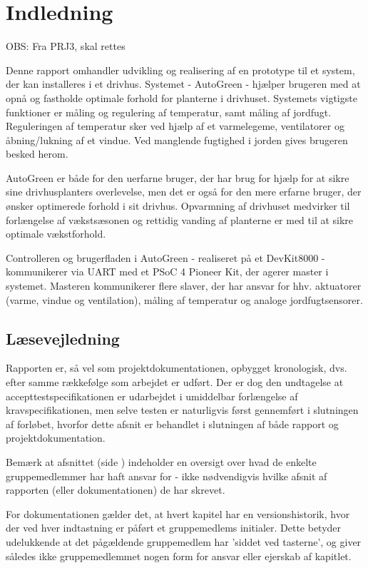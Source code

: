 \chapter{Indledning}
\label{ch:Indledning}

OBS: Fra PRJ3, skal rettes

Denne rapport omhandler udvikling og realisering af en prototype til et system, der kan installeres i et drivhus. 
Systemet - AutoGreen - hjælper brugeren med at opnå og fastholde optimale forhold for planterne i drivhuset.
Systemets vigtigste funktioner er måling og regulering af temperatur, samt måling af jordfugt.
Reguleringen af temperatur sker ved hjælp af et varmelegeme, ventilatorer og åbning/lukning af et vindue. 
Ved manglende fugtighed i jorden gives brugeren besked herom. 

AutoGreen er både for den uerfarne bruger, der har brug for hjælp for at sikre sine drivhusplanters overlevelse, men det er også for den mere erfarne bruger, der ønsker optimerede forhold i sit drivhus. 
Opvarmning af drivhuset medvirker til forlængelse af vækstsæsonen og rettidig vanding af planterne er med til at sikre optimale vækstforhold. 

Controlleren og brugerfladen i AutoGreen - realiseret på et DevKit8000 - kommunikerer via UART med et PSoC 4 Pioneer Kit, der agerer \IIC master i systemet. 
Masteren kommunikerer flere \IIC slaver, der har ansvar for hhv. aktuatorer (varme, vindue og ventilation), måling af temperatur og analoge jordfugtsensorer.

\section{Læsevejledning}
Rapporten er, så vel som projektdokumentationen, opbygget kronologisk, dvs. efter samme rækkefølge som arbejdet er udført. Der er dog den undtagelse at accepttestspecifikationen er udarbejdet i umiddelbar forlængelse af kravspecifikationen, men selve testen er naturligvis først gennemført i slutningen af forløbet, hvorfor dette afsnit er behandlet i slutningen af både rapport og projektdokumentation. 

Bemærk at afsnittet  (side \pageref{ch:arbejdsopgaver}) indeholder en oversigt over hvad de enkelte gruppemedlemmer har haft ansvar for - ikke nødvendigvis hvilke afsnit af rapporten (eller dokumentationen) de har skrevet. 

For dokumentationen gælder det, at hvert kapitel har en versionshistorik, hvor der ved hver indtastning er påført et gruppemedlems initialer. 
Dette betyder udelukkende at det pågældende gruppemedlem har 'siddet ved tasterne', og giver således ikke gruppemedlemmet nogen form for ansvar eller ejerskab af kapitlet. 

